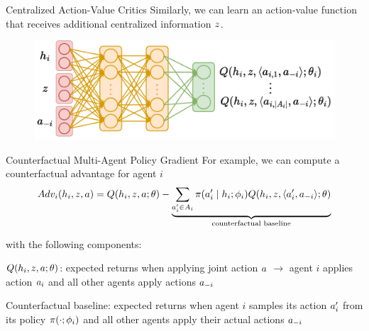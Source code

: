 \begin{frame}[t]{Centralized Action-Value Critics}
    Similarly, we can learn an action-value function that receives additional centralized information $z$.

    \begin{figure}[t]
        \centering
        \includegraphics[width=.8\linewidth]{images/chapter_9/macac_architecture.pdf}
    \end{figure}

\end{frame}

\begin{frame}[t]{Counterfactual Multi-Agent Policy Gradient}
    For example, we can compute a counterfactual advantage for agent $i$
    \begin{equation*}
        Adv_i(h_i, z, a) = Q(h_i, z, a; \theta) - \underbrace{\sum_{a^\prime_i \in A_i} \pi(a^\prime_i \mid h_i; \phi_i) Q(h_i, z, \langle a^\prime_i, a_{-i} \rangle; \theta)}_{\text{counterfactual baseline}}
    \end{equation*}

    \vspace{-1em}
    with the following components:

    \blist
        \item<2-> $Q(h_i, z, a; \theta)$: expected returns when applying joint action $a$ $\rightarrow$ agent $i$ applies action $a_i$ and all other agents apply actions $a_{-i}$
        \item<3-> Counterfactual baseline: expected returns when agent $i$ samples its action $a^\prime_i$ from its policy $\pi(\cdot; \phi_i)$ and all other agents apply their actual actions $a_{-i}$
    \elist

\end{frame}

